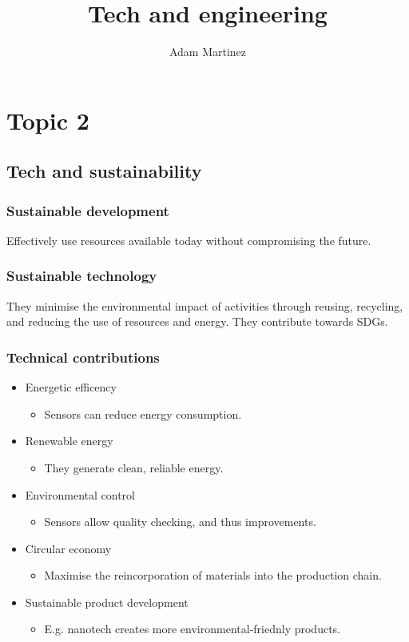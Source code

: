 \documentclass{article}
\title{Tech and engineering}
\author{Adam Martinez}
\date{}
\begin{document}
\maketitle

\section*{Topic 2}

\subsection*{Tech and sustainability}

\subsubsection*{Sustainable development}

Effectively use resources available today without compromising the future.

\subsubsection*{Sustainable technology}

They minimise the environmental impact of activities through reusing, recycling,
and reducing the use of resources and energy.
They contribute towards SDGs.

\subsubsection*{Technical contributions}

\begin{itemize}
    \item Energetic efficency
    \begin{itemize}
        \item Sensors can reduce energy consumption.
    \end{itemize}
    \item Renewable energy
    \begin{itemize}
        \item They generate clean, reliable energy.
    \end{itemize}
    \item Environmental control
    \begin{itemize}
        \item Sensors allow quality checking, and thus improvements.
    \end{itemize}
    \item Circular economy
    \begin{itemize}
        \item Maximise the reincorporation of materials into the production
        chain.
    \end{itemize}
    \item Sustainable product development
    \begin{itemize}
        \item E.g. nanotech creates more environmental-friednly products.
    \end{itemize}
\end{itemize}
\end{document}
